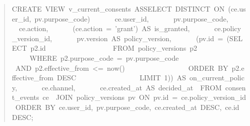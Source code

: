 \begin{quote}\scriptsize\ttfamily\raggedright
CREATE\ VIEW\ v\_\allowbreak{}current\_\allowbreak{}consents\ AS\newline{}SELECT\ DISTINCT\ ON\ (ce.user\_\allowbreak{}id,\ pv.purpose\_\allowbreak{}code)\newline{}\ \ \ \ \ \ \ ce.user\_\allowbreak{}id,\newline{}\ \ \ \ \ \ \ pv.purpose\_\allowbreak{}code,\newline{}\ \ \ \ \ \ \ ce.action,\newline{}\ \ \ \ \ \ \ (ce.action\ =\ 'grant')\ AS\ is\_\allowbreak{}granted,\newline{}\ \ \ \ \ \ \ ce.policy\_\allowbreak{}version\_\allowbreak{}id,\newline{}\ \ \ \ \ \ \ pv.version\ AS\ policy\_\allowbreak{}version,\newline{}\ \ \ \ \ \ \ (pv.id\ =\ (SELECT\ p2.id\newline{}\ \ \ \ \ \ \ \ \ \ \ \ \ \ \ \ \ \ \ FROM\ policy\_\allowbreak{}versions\ p2\newline{}\ \ \ \ \ \ \ \ \ \ \ \ \ \ \ \ \ \ WHERE\ p2.purpose\_\allowbreak{}code\ =\ pv.purpose\_\allowbreak{}code\newline{}\ \ \ \ \ \ \ \ \ \ \ \ \ \ \ \ \ \ \ \ AND\ p2.effective\_\allowbreak{}from\ <=\ now()\newline{}\ \ \ \ \ \ \ \ \ \ \ \ \ \ \ \ \ \ ORDER\ BY\ p2.effective\_\allowbreak{}from\ DESC\newline{}\ \ \ \ \ \ \ \ \ \ \ \ \ \ \ \ \ \ LIMIT\ 1))\ AS\ on\_\allowbreak{}current\_\allowbreak{}policy,\newline{}\ \ \ \ \ \ \ ce.channel,\newline{}\ \ \ \ \ \ \ ce.created\_\allowbreak{}at\ AS\ decided\_\allowbreak{}at\newline{}\ \ FROM\ consent\_\allowbreak{}events\ ce\newline{}\ \ JOIN\ policy\_\allowbreak{}versions\ pv\ ON\ pv.id\ =\ ce.policy\_\allowbreak{}version\_\allowbreak{}id\newline{}\ ORDER\ BY\ ce.user\_\allowbreak{}id,\ pv.purpose\_\allowbreak{}code,\ ce.created\_\allowbreak{}at\ DESC,\ ce.id\ DESC;
\end{quote}
